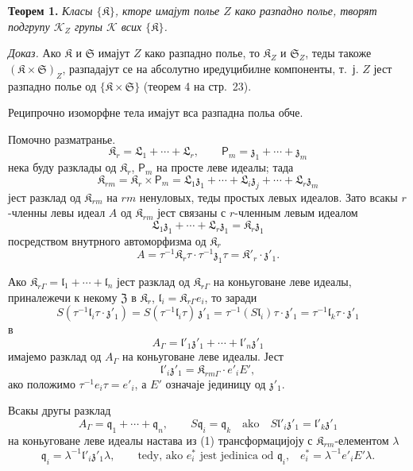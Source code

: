 \documentclass[11pt]{article}
\begin{document}
\textbf{Теорем 1.} \emph{Класы \(\{\mathfrak K\}\), кторе имајут полье \(Z\) како разпадно полье, творят подгрупу \(\mathscr K_Z\) групы \(\mathscr K\) всих \(\{\mathfrak K\}\).}

\emph{Доказ.} Ако \(\mathfrak K\) и \(\mathfrak S\) имајут \(Z\) како разпадно полье, то \(\mathfrak K_Z\) и \(\mathfrak S_Z\), теды такоже \((\mathfrak K\times\mathfrak S)_Z\), разпадајут се на абсолутно иредуцибилне компоненты, т.~ј. \(Z\) јест разпадно полье од \(\{\mathfrak K\times\mathfrak S\}\) (теорем 4 на стр.~23).

Реципрочно изоморфне тела имајут вса разпадна польа обче.

Помочно разматранье.
\[
\mathfrak K_r=\mathfrak L_1+\cdots+\mathfrak L_r,\qquad
\mathsf P_m=\mathfrak z_1+\cdots+\mathfrak z_m
\]
нека буду разклады од \(\mathfrak K_r\), \(\mathsf P_m\) на просте леве идеалы; тада
\[
\mathfrak K_{rm}=\mathfrak K_r\times\mathsf P_m
=\mathfrak L_1\mathfrak z_1+\cdots+\mathfrak L_i\mathfrak z_j+\cdots+\mathfrak L_r\mathfrak z_m
\]
јест разклад од \(\mathfrak K_{rm}\) на \(rm\) ненуловых, теды простых левых идеалов. Зато всакы \(r\)-членны левы идеал \(A\) од \(\mathfrak K_{rm}\) јест связаны с \(r\)-членным левым идеалом
\[
\mathfrak L_1\mathfrak z_1+\cdots+\mathfrak L_r\mathfrak z_1=\mathfrak K_r\mathfrak z_1
\]
посредством внутрного автоморфизма од \(\mathfrak K_r\)
\[
A=\tau^{-1}\mathfrak K_r\tau\cdot\tau^{-1}\mathfrak z_1\tau
=\mathfrak K'_r\cdot\mathfrak z'_1.
\]

Ако \(\mathfrak K_{r\Gamma}=\mathfrak l_1+\cdots+\mathfrak l_n\) јест разклад од \(\mathfrak K_{r\Gamma}\) на коньуговане леве идеалы, приналежечи к некому \(\mathfrak Z\) в \(\mathfrak K_r\), \(\mathfrak l_i=\mathfrak K_{r\Gamma}e_i\), то заради
\[
S(\tau^{-1}\mathfrak l_i\tau\cdot\mathfrak z'_1)
=S(\tau^{-1}\mathfrak l_i\tau)\,\mathfrak z'_1
=\tau^{-1}(S\mathfrak l_i)\tau\cdot\mathfrak z'_1
=\tau^{-1}\mathfrak l_k\tau\cdot\mathfrak z'_1
\]
в
\[
\tag{1}
A_\Gamma=\mathfrak l'_1\mathfrak z'_1+\cdots+\mathfrak l'_n\mathfrak z'_1
\]
имајемо разклад од \(A_\Gamma\) на коньуговане леве идеалы. Јест
\[
\mathfrak l'_i\mathfrak z'_1=\mathfrak K_{rm\Gamma}\cdot e'_iE',
\]
ако положимо \(\tau^{-1}e_i\tau=e'_i\), а \(E'\) означаје јединицу од \(\mathfrak z'_1\).

Всакы другы разклад
\[
\tag{2}
A_\Gamma=\mathfrak q_1+\cdots+\mathfrak q_n,\qquad
S\mathfrak q_i=\mathfrak q_k\quad\text{ako}\quad
S\mathfrak l'_i\mathfrak z'_1=\mathfrak l'_k\mathfrak z'_1
\]
на коньуговане леве идеалы настава из (1) трансформацијоју с \(\mathfrak K_{rm}\)-елементом \(\lambda\)
\[
\mathfrak q_i=\lambda^{-1}\mathfrak l'_i\mathfrak z'_1\lambda,
\qquad
\text{tedy, ako \(e_i^*\) jest jedinica od \(\mathfrak q_i\),}\quad
e_i^*=\lambda^{-1}e'_iE'\lambda.
\]
\end{document}
